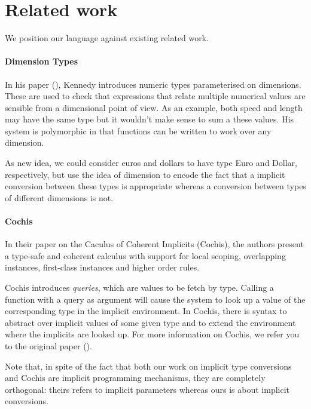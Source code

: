 \chapter{Related work}
\label{relatedwork}
We position our language against existing related work.
\subsubsection{Dimension Types}
In his paper (\cite{dimensiontypes}), Kennedy introduces numeric types parameterised on dimensions. These are used to check that expressions that relate multiple numerical values are sensible from a dimensional point of view. As an example, both speed and length may have the same type but it wouldn't make sense to sum a these values. His system is polymorphic in that functions can be written to work over any dimension.

As new idea, we could consider euros and dollars to have type Euro and Dollar, respectively, but use the idea of dimension to encode the fact that a implicit conversion between these types is appropriate whereas a conversion between types of different dimensions is not.
\subsubsection{Cochis}
In their paper on the Caculus of Coherent Implicits (Cochis), the authors present a type-safe and coherent calculus with support for local scoping, overlapping instances, first-class instances and higher order rules.

Cochis introduces \textit{queries}, which are values to be fetch by type. Calling a function with a query as argument will cause the system to look up a value of the corresponding type in the implicit environment. In Cochis, there is syntax to abstract over implicit values of some given type and to extend the environment where the implicits are looked up. For more information on Cochis, we refer you to the original paper (\cite{cochis}).

Note that, in spite of the fact that both our work on implicit type conversions and Cochis are implicit programming mechanisms, they are completely orthogonal: theirs refers to implicit parameters whereas ours is about implicit conversions.
